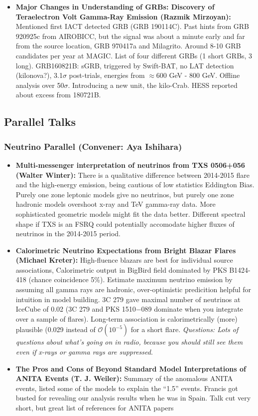\begin{itemize}
    \item \textbf{Major Changes in Understanding of GRBs: Discovery of Teraelectron Volt Gamma-Ray Emission (Razmik Mirzoyan):} Mentioned first IACT detected GRB (GRB 190114C). Past hints from GRB 920925c from AIROBICC, but the signal was about a minute early and far from the source location, GRB 970417a and Milagrito. Around 8-10 GRB candidates per year at MAGIC. List of four different GRBs (1 short GRBs, 3 long). GRB160821B: sGRB, triggered by Swift-BAT, no LAT detection (kilonova?), 3.1$\sigma$ post-trials, energies from $\approx 600$ GeV - 800 GeV. Offline analysis over 50$\sigma$. Introducing a new unit, the kilo-Crab. HESS reported about excess from 180721B. 
\end{itemize}

\subsection{Parallel Talks}
\subsubsection{Neutrino Parallel (Convener: Aya Ishihara)}
\begin{itemize}
    \item \textbf{Multi-messenger interpretation of neutrinos from TXS 0506+056 (Walter Winter):} There is a qualitative difference between 2014-2015 flare and the high-energy emission, being cautious of low statistics Eddington Bias. Purely one zone leptonic models give no neutrinos, but purely one zone hadronic models overshoot x-ray and TeV gamma-ray data. More sophisticated geometric models might fit the data better. Different spectral shape if TXS is an FSRQ could potentially accomodate higher fluxes of neutrinos in the 2014-2015 period. 
    \item \textbf{Calorimetric Neutrino Expectations from Bright Blazar Flares  (Michael Kreter):} High-fluence blazars are best for individual source associations, Calorimetric output in BigBird field dominated by PKS B1424-418 (chance coincidence 5\%). Estimate maximum neutrino emission by assuming all gamma rays are hadronic, over-optimistic predicition helpful for intuition in model building. 3C 279 gave maximal number of neutrinos at IceCube of 0.02 (3C 279 and PKS 1510−089 dominate when you integrate over a sample of flares). Long-term association is calorimetrically (more) plausible (0.029 instead of $\mathcal{O}(10^{-5})$ for a short flare. \textit{Questions: Lots of questions about what's going on in radio, because you should still see them even if x-rays or gamma rays are suppressed}.
    \item \textbf{ The Pros and Cons of Beyond Standard Model Interpretations of ANITA Events (T. J. Weiler):} Summary of the anomalous ANITA events, listed some of the models to explain the ``1.5'' events. Francis got busted for revealing our analysis results when he was in Spain. Talk cut very short, but great list of references for ANITA papers
\end{itemize}
